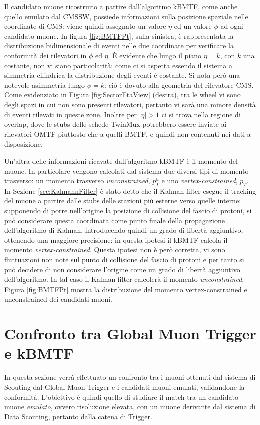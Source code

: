 Il candidato muone ricostruito a partire dall'algoritmo kBMTF, come anche quello emulato dal CMSSW, possiede informazioni sulla posizione spaziale nelle coordinate di CMS: viene quindi assegnato un valore $\eta$ ed un valore $\phi$ ad ogni candidato muone. In figura \ref{fig:BMTFPt}, sulla sinistra, è rappresentata la distribuzione bidimensionale di eventi nelle due coordinate per verificare la conformità dei rilevatori in $\phi$ ed $\eta$. È evidente che lungo il piano $\eta = k$, con $k$ una costante, non vi siano particolarità: come ci si aspetta essendo il sistema a simmetria cilindrica la distribuzione degli eventi è costante. Si nota però una notevole asimmetria lungo $\phi = k$: ciò è dovuto alla geometria del rilevatore CMS. Come evidenziato in Figura \ref{fig:SectorEtaView} (destra), tra le wheel vi sono degli spazi in cui non sono presenti rilevatori, pertanto vi sarà una minore densità di eventi rilevati in queste zone. Inoltre per $|\eta| > 1$ ci si trova nella regione di overlap, dove le stubs delle schede TwinMux potrebbero essere inviate ai rilevatori OMTF piuttosto che a quelli BMTF, e quindi non contenuti nei dati a disposizione.

Un'altra delle informazioni ricavate dall'algoritmo kBMTF è il momento del muone. In particolare vengono calcolati dal sistema due diversi tipi di momento trasverso: un momento trasverso \textit{unconstrained}, $p_T^u$ e uno \textit{vertex-constrained}, $p_T$. In Sezione \ref{sec:KalmannFilter} è stato detto che il Kalman filter esegue il tracking del muone a partire dalle stubs delle stazioni più esterne verso quelle interne: supponendo di porre nell'origine la posizione di collisione del fascio di protoni, si può considerare questa coordinata come punto finale della propagazione dell'algoritmo di Kalman, introducendo quindi un grado di libertà aggiuntivo, ottenendo una maggiore precisione: in questa ipotesi il kBMTF calcola il momento \textit{vertex-constrained}. \newline
Questa ipotesi non è però corretta, vi sono fluttuazioni non note sul punto di collisione del fascio di protoni e per tanto si può decidere di non considerare l'origine come un grado di libertà aggiuntivo dell'algoritmo. In tal caso il Kalman filter calcolerà il momento \textit{unconstrained}. 
Figura \ref{fig:BMTFPt} mostra la distribuzione del momento vertex-constrained e unconstrained dei candidati muoni. 


\section{Confronto tra Global Muon Trigger e kBMTF}
\label{sec:Confronto}
In questa sezione verrà effettuato un confronto tra i muoni ottenuti dal sistema di Scouting dal Global Muon Trigger e i candidati muoni emulati, validandone la conformità. L'obiettivo è quindi quello di studiare il match tra un candidato muone \textit{emulato}, ovvero risoluzione elevata, con un muone derivante dal sistema di Data Scouting, pertanto dalla catena di Trigger.


